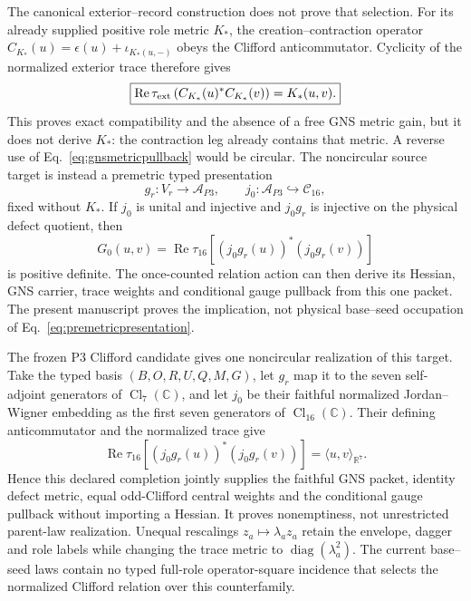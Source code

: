 \documentclass[11pt]{article}
\begin{document}
The canonical exterior--record construction does not prove that selection.
For its already supplied positive role metric $K_*$, the
creation--contraction operator
$C_{K_*}(u)=\epsilon(u)+\iota_{K_*(u,-)}$ obeys the Clifford
anticommutator.  Cyclicity of the normalized exterior trace therefore gives
\begin{equation}
\boxed{
\operatorname{Re}\tau_{\rm ext}
 \left(C_{K_*}(u)^*C_{K_*}(v)\right)=K_*(u,v).}
\label{eq:gnsmetricpullback}
\end{equation}
This proves exact compatibility and the absence of a free GNS metric gain,
but it does not derive $K_*$: the contraction leg already contains that
metric.  A reverse use of Eq.~\eqref{eq:gnsmetricpullback} would be circular.
The noncircular source target is instead a premetric typed presentation
\begin{equation}
g_r:V_r\longrightarrow\mathcal A_{P3},\qquad
j_0:\mathcal A_{P3}\hookrightarrow\mathcal C_{16},
\label{eq:premetricpresentation}
\end{equation}
fixed without $K_*$.  If $j_0$ is unital and injective and $j_0g_r$ is
injective on the physical defect quotient, then
\begin{equation}
G_0(u,v)=\operatorname{Re}\tau_{16}
 \left[(j_0g_r(u))^*(j_0g_r(v))\right]
\label{eq:premetricpullback}
\end{equation}
is positive definite.  The once-counted relation action can then derive its
Hessian, GNS carrier, trace weights and conditional gauge pullback from this
one packet.  The present manuscript proves the implication, not physical
base--seed occupation of Eq.~\eqref{eq:premetricpresentation}.

The frozen P3 Clifford candidate gives one noncircular realization of this
target.  Take the typed basis $(B,O,R,U,Q,M,G)$, let $g_r$ map it to the
seven self-adjoint generators of $\operatorname{Cl}_7(\mathbb C)$, and let
$j_0$ be their faithful normalized Jordan--Wigner embedding as the first
seven generators of $\operatorname{Cl}_{16}(\mathbb C)$.  Their defining
anticommutator and the normalized trace give
\begin{equation}
\operatorname{Re}\tau_{16}
 \left[(j_0g_r(u))^*(j_0g_r(v))\right]
=\langle u,v\rangle_{\mathbb R^7}.
\label{eq:premetricclifford}
\end{equation}
Hence this declared completion jointly supplies the faithful GNS packet,
identity defect metric, equal odd-Clifford central weights and the
conditional gauge pullback without importing a Hessian.  It proves
nonemptiness, not unrestricted parent-law realization.  Unequal rescalings
$z_a\mapsto\lambda_a z_a$ retain the envelope, dagger and role labels while
changing the trace metric to $\operatorname{diag}(\lambda_a^2)$.  The current
base--seed laws contain no typed full-role operator-square incidence that
selects the normalized Clifford relation over this counterfamily.
\end{document}
